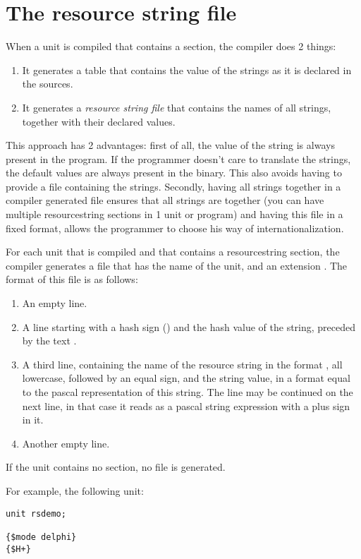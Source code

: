 {\section{The resource string file}
When a unit is compiled that contains a  section,
the compiler does 2 things:
\begin{enumerate}
\item It generates a table that contains the value of the strings as it
is declared in the sources.
\item It generates a {\em resource string file} that contains the names
of all strings, together with their declared values.
\end{enumerate}
This approach has 2 advantages: first of all, the value of the string is
always present in the program. If the programmer doesn't care to translate
the strings, the default values are always present in the binary. This also
avoids having to provide a file containing the strings. Secondly, having all
strings together in a compiler generated file ensures that all strings are
together (you can have multiple resourcestring sections in 1 unit or program)
and having this file in a fixed format, allows the programmer to choose his
way of internationalization.

For each unit that is compiled and that contains a resourcestring section,
the compiler generates a file that has the name of the unit, and an
extension . The format of this file is as follows:
\begin{enumerate}
\item An empty line.
\item A line starting with a hash sign (\var{\#}) and the hash value of the
  string, preceded by the text .
\item A third line, containing the name of the resource string in the format
, all lowercase, followed by an equal sign, and
the string value, in a format equal to the pascal representation of this
string. The line may be continued on the next line, in that case it reads as
a pascal string expression with a plus sign in it.
\item Another empty line.
\end{enumerate}
If the unit contains no  section, no file is generated.

For example, the following unit:
\begin{verbatim}
unit rsdemo;

{$mode delphi}
{$H+}


\end{verbatim}}
